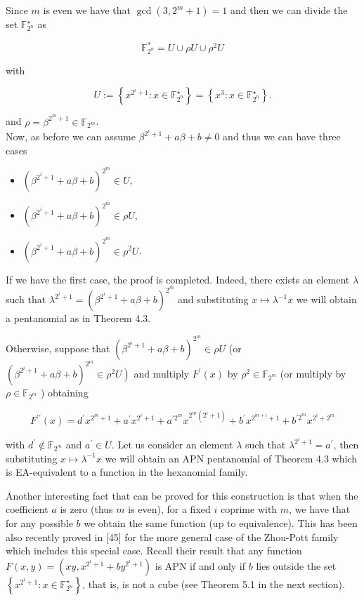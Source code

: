 \documentclass[10pt]{article}
\begin{document}
Since $m$ is even we have that $\operatorname{gcd}\left(3,2^{m}+1\right)=1$ and then we can divide the set $\mathbb{F}_{2^{n}}^{\star}$ as

$$
\mathbb{F}_{2^{n}}^{*}=U \cup \rho U \cup \rho^{2} U
$$

with

$$
U:=\left\{x^{2^{i}+1}: x \in \mathbb{F}_{2^{n}}^{\star}\right\}=\left\{x^{3}: x \in \mathbb{F}_{2^{n}}^{\star}\right\} .
$$

and $\rho=\beta^{2^{m}+1} \in \mathbb{F}_{2^{m}}$.\\
Now, as before we can assume $\beta^{2^{i}+1}+a \beta+b \neq 0$ and thus we can have three cases

\begin{itemize}
  \item $\left(\beta^{2^{i}+1}+a \beta+b\right)^{2^{m}} \in U$,
  \item $\left(\beta^{2^{i}+1}+a \beta+b\right)^{2^{m}} \in \rho U$,
  \item $\left(\beta^{2^{i}+1}+a \beta+b\right)^{2^{m}} \in \rho^{2} U$.
\end{itemize}

If we have the first case, the proof is completed. Indeed, there exists an element $\lambda$ such that $\lambda^{2^{i}+1}=\left(\beta^{2^{i}+1}+a \beta+b\right)^{2^{m}}$ and substituting $x \mapsto \lambda^{-1} x$ we will obtain a pentanomial as in Theorem 4.3.

Otherwise, suppose that $\left(\beta^{2^{i}+1}+a \beta+b\right)^{2^{m}} \in \rho U$ (or $\left(\beta^{2^{i}+1}+a \beta+b\right)^{2^{m}} \in \left.\rho^{2} U\right)$ and multiply $F^{\prime}(x)$ by $\rho^{2} \in \mathbb{F}_{2^{m}}$ (or multiply by $\rho \in \mathbb{F}_{2^{m}}$ ) obtaining

$$
F^{\prime \prime}(x)=d^{\prime} x^{2^{m}+1}+a^{\prime} x^{2^{i}+1}+a^{\prime 2^{m}} x^{2^{m}\left(2^{i}+1\right)}+b^{\prime} x^{2^{m+i}+1}+b^{\prime 2^{m}} x^{2^{i}+2^{m}}
$$

with $d^{\prime} \notin \mathbb{F}_{2^{m}}$ and $a^{\prime} \in U$. Let us consider an element $\lambda$ such that $\lambda^{2^{i}+1}=a^{\prime}$, then substituting $x \mapsto \lambda^{-1} x$ we will obtain an APN pentanomial of Theorem 4.3 which is EA-equivalent to a function in the hexanomial family.

Another interesting fact that can be proved for this construction is that when the coefficient $a$ is zero (thus $m$ is even), for a fixed $i$ coprime with $m$, we have that for any possible $b$ we obtain the same function (up to equivalence). This has been also recently proved in [45] for the more general case of the Zhou-Pott family which includes this special case. Recall their result that any function $F(x, y)=\left(x y, x^{2^{i}+1}+b y^{2^{i}+1}\right)$ is APN if and only if $b$ lies outside the set $\left\{x^{2^{i}+1}: x \in \mathbb{F}_{2^{n}}^{\star}\right\}$, that is, is not a cube (see Theorem 5.1 in the next section).
\end{document}

